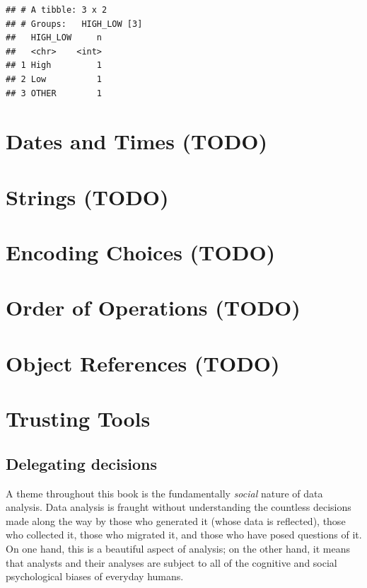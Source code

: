 \documentclass[
]{krantz}
\begin{document}
\begin{verbatim}
## # A tibble: 3 x 2
## # Groups:   HIGH_LOW [3]
##   HIGH_LOW     n
##   <chr>    <int>
## 1 High         1
## 2 Low          1
## 3 OTHER        1
\end{verbatim}

\hypertarget{dates-and-times-todo}{%
\section{Dates and Times (TODO)}\label{dates-and-times-todo}}

\hypertarget{strings-todo}{%
\section{Strings (TODO)}\label{strings-todo}}

\hypertarget{encoding-choices-todo}{%
\section{Encoding Choices (TODO)}\label{encoding-choices-todo}}

\hypertarget{order-of-operations-todo}{%
\section{Order of Operations (TODO)}\label{order-of-operations-todo}}

\hypertarget{object-references-todo}{%
\section{Object References (TODO)}\label{object-references-todo}}

\hypertarget{trusting-tools}{%
\section{Trusting Tools}\label{trusting-tools}}

\hypertarget{delegating-decisions}{%
\subsection{Delegating decisions}\label{delegating-decisions}}

A theme throughout this book is the fundamentally \emph{social} nature of data analysis. Data analysis is fraught without understanding the countless decisions made along the way by those who generated it (whose data is reflected), those who collected it, those who migrated it, and those who have posed questions of it. On one hand, this is a beautiful aspect of analysis; on the other hand, it means that analysts and their analyses are subject to all of the cognitive and social psychological biases of everyday humans.
\end{document}
